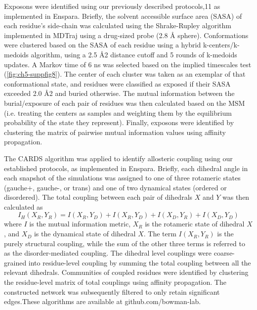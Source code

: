 \documentclass[../main.tex]{subfiles}
\begin{document}
        Exposons were identified using our previously described protocols,11 as implemented in Enspara\cite{porter2018enspara}. Briefly, the solvent accessible surface area (SASA) of each residue’s side-chain was calculated using the Shrake-Rupley algorithm\cite{shrake_environment_1973} implemented in MDTraj\cite{McGibbon:2015fv} using a drug-sized probe (2.8 \AA{} sphere). Conformations were clustered based on the SASA of each residue using a hybrid k-centers/k-medoids algorithm, using a 2.5 \AA{}2 distance cutoff and 5 rounds of k-medoids updates. A Markov time of 6 ns was selected based on the implied timescales test (\ref{fig:ch5-suppfig8}). The center of each cluster was taken as an exemplar of that conformational state, and residues were classified as exposed if their SASA exceeded 2.0 \AA{}2 and buried otherwise. The mutual information between the burial/exposure of each pair of residues was then calculated based on the MSM (i.e. treating the centers as samples and weighting them by the equilibrium probability of the state they represent). Finally, exposons were identified by clustering the matrix of pairwise mutual information values using affinity propagation\cite{Frey:2007hs}.

        The CARDS algorithm\cite{Singh:2017hh} was applied to identify allosteric coupling using our established protocols\cite{Sun:2018kx}, as implemented in Enspara\cite{Singh:2017hh}. Briefly, each dihedral angle in each snapshot of the simulations was assigned to one of three rotameric states (gauche+, gauche-, or trans) and one of two dynamical states (ordered or disordered). The total coupling between each pair of dihedrals $X$ and $Y$ was then calculated as 
        \begin{equation}\label{holistic-mut-inf-eq}
            I_{H}(X_{R},Y_R) = I(X_R,Y_D)+I(X_R,Y_D)+I(X_D,Y_R)+I(X_D,Y_D)
        \end{equation}
         where $I$ is the mutual information metric, $X_R$ is the rotameric state of dihedral $X$, and $X_D$ is the dynamical state of dihedral $X$. The term $I(X_R,Y_R )$ is the purely structural coupling, while the sum of the other three terms is referred to as the disorder-mediated coupling. The dihedral level couplings were coarse-grained into residue-level coupling by summing the total coupling between all the relevant dihedrals. Communities of coupled residues were identified by clustering the residue-level matrix of total couplings using affinity propagation\cite{Frey:2007hs}. The constructed network was subsequently filtered to only retain significant edges\cite{Dianati:2016bt}.These algorithms are available at github.com/bowman-lab. 
\end{document}
